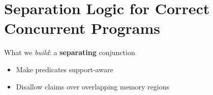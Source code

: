\newcommand{\sepconj}{\ensuremath{\mathrel{*}}}

\section[Separation Logic]{Separation Logic for Correct Concurrent Programs}


\newcommand{\centered}[1]{\begin{tabular}{l} #1 \end{tabular}}

\begin{frame}{What we \textit{build}: a {\bf separating} conjunction}

  \begin{itemize}
    \item Make predicates support-aware
    \item Disallow claims over overlapping memory regions
  \end{itemize}

  \vfill


\newcommand{\Pointssupport}{{
  \begin{bytefield}[bitwidth=3mm, bitheight=3mm]{4}
    \\
    \bitbox[lt]{1}[bgcolor=white]{ }
    \bitbox[t]{1}[bgcolor=white]{ }
    \bitbox[t]{1}[bgcolor=white]{ }
    \bitbox[t]{1}[bgcolor=white]{ }
    \bitbox[rt]{1}[bgcolor=white]{ }
    \vspace{-1.5mm}\\
    \bitbox[l]{1}[bgcolor=white]{ }
    \bitbox[]{1}[bgcolor=white]{ }
    \bitbox[]{1}[bgcolor=white]{ }
    \bitbox[]{1}[bgcolor=blue]{ }
    \bitbox[r]{1}[bgcolor=white]{ }
    \vspace{-1.5mm}\\
    \bitbox[lb]{1}[bgcolor=white]{ }
    \bitbox[b]{1}[bgcolor=white]{ }
    \bitbox[b]{1}[bgcolor=white]{ }
    \bitbox[b]{1}[bgcolor=white]{ }
    \bitbox[rb]{1}[bgcolor=white]{ }
  \end{bytefield}}}

\newcommand{\Propsupport}{{
  \begin{bytefield}[bitwidth=3mm, bitheight=3mm]{4}
    \\
    \bitbox[lt]{1}[bgcolor=white]{ }
    \bitbox[t]{1}[bgcolor=white]{ }
    \bitbox[t]{1}[bgcolor=white]{ }
    \bitbox[t]{1}[bgcolor=white]{ }
    \bitbox[rt]{1}[bgcolor=white]{ }
    \vspace{-1.5mm}\\
    \bitbox[l]{1}[bgcolor=white]{ }
    \bitbox[]{1}[bgcolor=white]{ }
    \bitbox[]{1}[bgcolor=white]{ }
    \bitbox[]{1}[bgcolor=white]{ }
    \bitbox[r]{1}[bgcolor=white]{ }
    \vspace{-1.5mm}\\
    \bitbox[lb]{1}[bgcolor=white]{ }
    \bitbox[b]{1}[bgcolor=white]{ }
    \bitbox[b]{1}[bgcolor=white]{ }
    \bitbox[b]{1}[bgcolor=white]{ }
    \bitbox[rb]{1}[bgcolor=white]{ }
  \end{bytefield}}
}


\end{frame}
